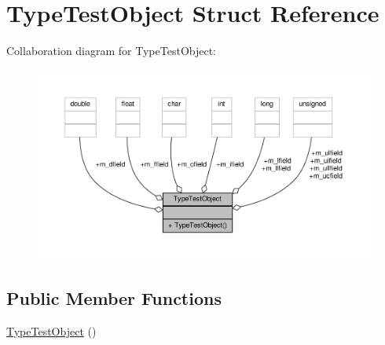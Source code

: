 \hypertarget{structTypeTestObject}{\section{Type\-Test\-Object Struct Reference}
\label{structTypeTestObject}
}


Collaboration diagram for Type\-Test\-Object\-:
\nopagebreak
\begin{figure}[H]
\begin{center}
\leavevmode
\includegraphics[width=350pt]{structTypeTestObject__coll__graph}
\end{center}
\end{figure}
\subsection*{Public Member Functions}
\begin{DoxyCompactItemize}
\item 
\hyperlink{structTypeTestObject_adf87428f5ec251622e82afe39a2e92e6}{Type\-Test\-Object} ()
\end{DoxyCompactItemize}
